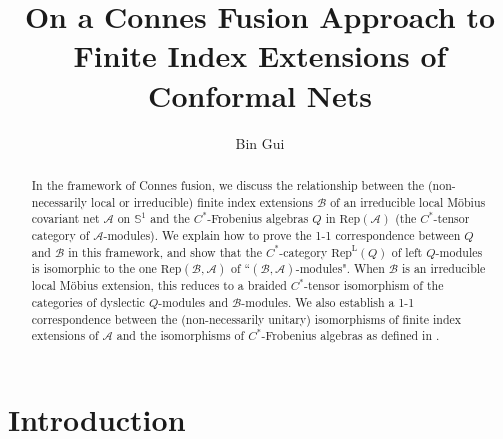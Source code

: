 \documentclass[11pt,b5paper,notitlepage]{article}
\title{On a Connes Fusion Approach to Finite Index Extensions of Conformal Nets}
\author{{\sc Bin Gui}
}
\date{}
\theoremstyle{definition}
\theoremstyle{plain}
\newcommand{\mc}{\mathcal}
\newcommand{\Rep}{\mathrm{Rep}}
\newcommand{\RepA}{\mathrm{Rep}(\mathcal A)}
\newcommand{\RepL}{\mathrm{Rep}^{\mathrm{L}}}
\newcommand{\Sbb}{{\mathbb S}}
\numberwithin{equation}{section}
\begin{document}
\sloppy %
	\setcounter{section}{-1}
	
	
	
	\maketitle
	
	
\newcommand\blfootnote[1]{%
	\begingroup
	\renewcommand\thefootnote{}\footnote{#1}%
	\addtocounter{footnote}{-1}%
	\endgroup
}



\begin{abstract}
In the framework of Connes fusion, we discuss the relationship between the  (non-necessarily local or irreducible) finite index extensions $\mc B$ of an irreducible local M\"obius covariant net $\mc A$ on $\Sbb^1$ and the $C^*$-Frobenius algebras $Q$ in $\RepA$ (the $C^*$-tensor category  of  $\mc A$-modules). We explain how to prove the 1-1 correspondence between $Q$ and $\mc B$ in this framework, and show that the $C^*$-category $\RepL(Q)$ of left $Q$-modules is isomorphic to the one $\Rep(\mc B,\mc A)$ of ``$(\mc B,\mc A)$-modules". When $\mc B$ is an irreducible local M\"obius extension, this reduces to a braided $C^*$-tensor isomorphism of the categories of dyslectic $Q$-modules and $\mc B$-modules. We also establish a 1-1 correspondence between the (non-necessarily unitary)  isomorphisms of finite index extensions of $\mc A$ and the isomorphisms of $C^*$-Frobenius algebras as defined in \cite{NY18}.
\end{abstract}


\tableofcontents




	


\section{Introduction}
\end{document}
